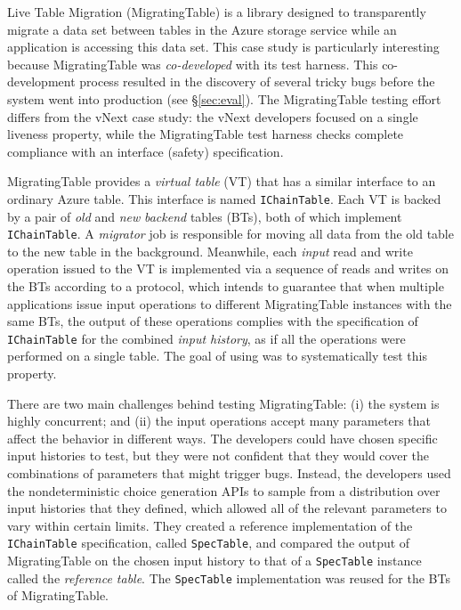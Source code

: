 Live Table Migration (MigratingTable) is a library designed to transparently migrate a data set between tables in the Azure storage service while an application is accessing this data set. This case study is particularly interesting because MigratingTable was \emph{co-developed} with its \psharp test harness. This co-development process resulted in the discovery of several tricky bugs before the system went into production (see \S\ref{sec:eval}). The MigratingTable testing effort differs from the vNext case study: the vNext developers focused on a single liveness property, while the MigratingTable test harness checks complete compliance with an interface (safety) specification.

MigratingTable provides a \emph{virtual table} (VT) that has a similar interface
to an ordinary Azure table. This interface is
named \texttt{IChainTable}. Each VT is backed by a pair
of \emph{old} and \emph{new} \emph{backend} tables (BTs), both of which
implement \texttt{IChainTable}. A \emph{migrator} job is responsible
for moving all data from the old table to the new table in the
background. Meanwhile, each \emph{input} read and write operation
issued to the VT is implemented via a sequence
of reads and writes on the BTs according to a protocol,
which intends to guarantee that when multiple applications issue input
operations to different MigratingTable instances with the same BTs, the output of these operations complies with the specification
of \texttt{IChainTable} for the combined \emph{input history}, as if
all the operations were performed on a single table. The goal of
using \psharp was to systematically test this property.

There are two main challenges behind testing MigratingTable: (i) the system is highly concurrent; and (ii) the input operations accept many parameters that affect the behavior in different ways. The developers could have chosen specific input histories to test, but they were not confident that they would cover the combinations of parameters that might trigger bugs. Instead, the developers used the \psharp nondeterministic choice generation APIs to sample from a distribution over input histories that they defined, which allowed all of the relevant parameters to vary within certain limits. They created a reference implementation of the \texttt{IChainTable} specification, called \texttt{SpecTable}, and compared the output of MigratingTable on the chosen input history to that of a \texttt{SpecTable} instance called the \emph{reference table}. The \texttt{SpecTable} implementation was reused for the BTs of MigratingTable.

